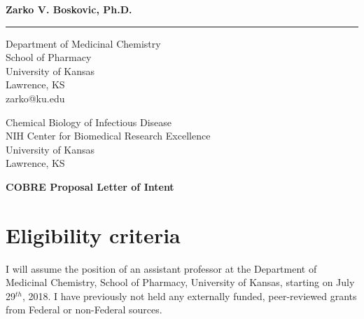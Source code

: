 \documentclass{letter}
\begin{document}
\begin{letter}{}

\begin{minipage}{\textwidth}
    \vspace{-1cm}
    \begin{flushleft}
    {\large\bf Zarko V. Boskovic, Ph.D.}
    \end{flushleft}
    \medskip\hrule height 1pt
    \begin{flushright}
    \hfill Department of Medicinal Chemistry \\
    \hfill School of Pharmacy\\
    \hfill University of Kansas\\
    \hfill Lawrence, KS\\
    \hfill zarko@ku.edu\\
    \end{flushright}
\end{minipage}

{Chemical Biology of Infectious Disease\\
NIH Center for Biomedical Research Excellence\\
University of Kansas\\
Lawrence, KS}
\begin{center}
\textbf{COBRE Proposal Letter of Intent}\\
\end{center}
\opening{}
\section{Eligibility criteria}
I will assume the position of an assistant professor at the Department of Medicinal Chemistry, School of Pharmacy, University of Kansas, starting on July 29$^{th}$, 2018. I have previously not held any externally funded, peer-reviewed grants from Federal or non-Federal sources.

\end{letter}
\end{document}
